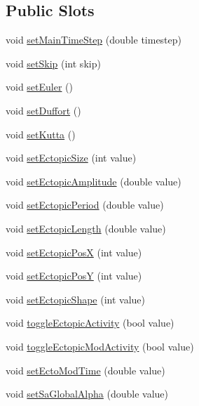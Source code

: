 \subsection*{Public Slots}
\begin{DoxyCompactItemize}
\item 
void \hyperlink{classatrial_parameters_a78d1ea1d1f6c256851cf7b83a8a21707}{set\+Main\+Time\+Step} (double timestep)
\item 
void \hyperlink{classatrial_parameters_a7606b5002a1af27bc97187d2e6c3627b}{set\+Skip} (int skip)
\item 
void \hyperlink{classatrial_parameters_a4dd8c8fb864448c607126b224dc9179f}{set\+Euler} ()
\item 
void \hyperlink{classatrial_parameters_a8debca6529b58fa7105c2cf339c9b94d}{set\+Duffort} ()
\item 
void \hyperlink{classatrial_parameters_ad9e7b355f6c3e0daba1146094fd3ddaa}{set\+Kutta} ()
\item 
void \hyperlink{classatrial_parameters_a4c355267171aa97dda88cf96dd205e92}{set\+Ectopic\+Size} (int value)
\item 
void \hyperlink{classatrial_parameters_a9b0cce5a057acb4b7180b783268f0d1b}{set\+Ectopic\+Amplitude} (double value)
\item 
void \hyperlink{classatrial_parameters_a331034e42e78eee66c208855f1bf871b}{set\+Ectopic\+Period} (double value)
\item 
void \hyperlink{classatrial_parameters_a4d86ff607fd2c7b05256fae26883f076}{set\+Ectopic\+Length} (double value)
\item 
void \hyperlink{classatrial_parameters_a8d9fad90f88588a4fb4f28db435afc7a}{set\+Ectopic\+Pos\+X} (int value)
\item 
void \hyperlink{classatrial_parameters_a0599af0dbe33406d002439d4d217fbd2}{set\+Ectopic\+Pos\+Y} (int value)
\item 
void \hyperlink{classatrial_parameters_a1a3511950c14ba3ba34eae948f18380f}{set\+Ectopic\+Shape} (int value)
\item 
void \hyperlink{classatrial_parameters_a4d79c3892b7b7378e03956a843969a50}{toggle\+Ectopic\+Activity} (bool value)
\item 
void \hyperlink{classatrial_parameters_ac3b7b3af7884c95d00e9bcc4e3a5e232}{toggle\+Ectopic\+Mod\+Activity} (bool value)
\item 
void \hyperlink{classatrial_parameters_abf71a393c2ba83420004f8b247c18632}{set\+Ecto\+Mod\+Time} (double value)
\item 
void \hyperlink{classatrial_parameters_aa8568ffc4c3280b182f1c99a270c2828}{set\+Sa\+Global\+Alpha} (double value)

\end{DoxyCompactItemize}
